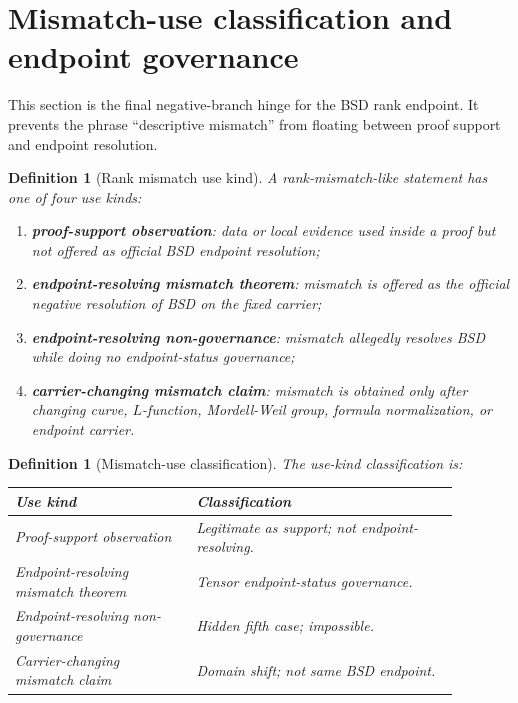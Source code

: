 \documentclass[11pt]{article}
\newtheorem{definition}[theorem]{Definition}
\begin{document}
\section{Mismatch-use classification and endpoint governance}

This section is the final negative-branch hinge for the BSD rank endpoint. It prevents the phrase ``descriptive mismatch'' from floating between proof support and endpoint resolution.


\begin{definition}[Rank mismatch use kind]
A rank-mismatch-like statement has one of four use kinds:
\begin{enumerate}[label=(\roman*)]
\item \textbf{proof-support observation}: data or local evidence used inside a proof but not offered as official BSD endpoint resolution;
\item \textbf{endpoint-resolving mismatch theorem}: mismatch is offered as the official negative resolution of BSD on the fixed carrier;
\item \textbf{endpoint-resolving non-governance}: mismatch allegedly resolves BSD while doing no endpoint-status governance;
\item \textbf{carrier-changing mismatch claim}: mismatch is obtained only after changing curve, $L$-function, Mordell-Weil group, formula normalization, or endpoint carrier.
\end{enumerate}
\end{definition}

\begin{definition}[Mismatch-use classification]
The use-kind classification is:
\begin{center}
\begin{tabular}{L{0.36\linewidth}L{0.52\linewidth}}
\toprule
\textbf{Use kind} & \textbf{Classification}\\
\midrule
Proof-support observation & Legitimate as support; not endpoint-resolving.\\
Endpoint-resolving mismatch theorem & Tensor endpoint-status governance.\\
Endpoint-resolving non-governance & Hidden fifth case; impossible.\\
Carrier-changing mismatch claim & Domain shift; not same BSD endpoint.\\
\bottomrule
\end{tabular}
\end{center}
\end{definition}
\end{document}
